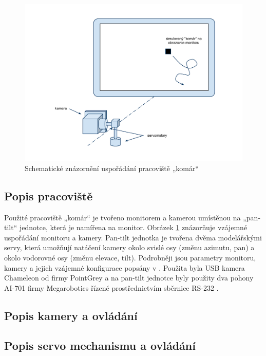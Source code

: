 \documentclass[a4paper,10pt]{article}
\begin{document}
		\begin{figure}[!h]
			\centering
			 \includegraphics[width=1\columnwidth]{pics/usporadani_pracoviste}
			 \caption{Schematické znázornění uspořádání pracoviště „komár“}\label{fig:usporadaniPracoviste}
		\end{figure}

	\subsection{Popis pracoviště}

		Použité pracoviště „komár“ je tvořeno monitorem a kamerou umístěnou na „pan-tilt“ jednotce, která je namířena
		na monitor. Obrázek \ref{fig:usporadaniPracoviste} znázorňuje vzájemné uspořádání monitoru a kamery.
		Pan-tilt jednotka je tvořena dvěma mo\-de\-lář\-ský\-mi servy, která umožňují natáčení kamery okolo svislé osy
		(změnu azimutu, pan) a okolo vodorovné osy (změnu elevace, tilt).
		Podrobněji jsou parametry monitoru, kamery a jejich vzájemné konfigurace popsány v \cite{kamera}.
		Použita byla USB kamera Chameleon od firmy PointGrey \cite{kameraDatasheet} a na pan-tilt jednotce byly
		použity dva pohony AI-701 firmy Megarobotics řízené prostřednictvím sběrnice RS-232 \cite{servaManual}.

	\subsection{Popis kamery a ovládání}

	\subsection{Popis servo mechanismu a ovládání}
\end{document}
